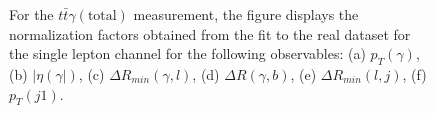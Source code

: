 \begin{figure}[ht]
  \quad
  \caption{For the $t\bar{t}\gamma(\mathrm{total})$ measurement, the figure displays the normalization factors obtained from the fit to the real dataset for the single 
  lepton channel for the following observables: (a) $p_T(\gamma)$, (b) $|\eta(\gamma|)$, 
  (c) $\Delta R_{min}(\gamma, l)$, (d) $\Delta R(\gamma, b)$, (e) $\Delta R_{min}(l, j)$, (f) $p_T(j1)$.}
  \label{fig:pt_unfolded_ljet_table_tty_total_realdata}
\end{figure}
\FloatBarrier


